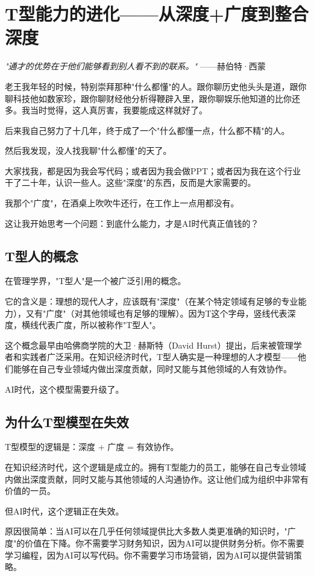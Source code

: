 \chapter{T型能力的进化——从深度+广度到整合深度}


\textit{"通才的优势在于他们能够看到别人看不到的联系。"}
——赫伯特·西蒙


老王我年轻的时候，特别崇拜那种"什么都懂"的人。跟你聊历史他头头是道，跟你聊科技他如数家珍，跟你聊财经他分析得鞭辟入里，跟你聊娱乐他知道的比你还多。我当时觉得，这人真厉害，我要能成这样就好了。

后来我自己努力了十几年，终于成了一个"什么都懂一点，什么都不精"的人。

然后我发现，没人找我聊"什么都懂"的天了。

大家找我，都是因为我会写代码；或者因为我会做PPT；或者因为我在这个行业干了二十年，认识一些人。这些"深度"的东西，反而是大家需要的。

我那个"广度"，在酒桌上吹吹牛还行，在工作上一点用都没有。

这让我开始思考一个问题：到底什么能力，才是AI时代真正值钱的？

\section{T型人的概念}


在管理学界，"T型人"是一个被广泛引用的概念。

它的含义是：理想的现代人才，应该既有"深度"（在某个特定领域有足够的专业能力），又有"广度"（对其他领域也有足够的理解）。因为T这个字母，竖线代表深度，横线代表广度，所以被称作"T型人"。

这个概念最早由哈佛商学院的大卫·赫斯特（David Hurst）提出，后来被管理学者和实践者广泛采用。在知识经济时代，T型人确实是一种理想的人才模型——他们能够在自己专业领域内做出深度贡献，同时又能与其他领域的人有效协作。

AI时代，这个模型需要升级了。

\section{为什么T型模型在失效}


T型模型的逻辑是：深度 + 广度 = 有效协作。

在知识经济时代，这个逻辑是成立的。拥有T型能力的员工，能够在自己专业领域内做出深度贡献，同时又能与其他领域的人沟通协作。这让他们成为组织中非常有价值的一员。

但AI时代，这个逻辑正在失效。

原因很简单：当AI可以在几乎任何领域提供比大多数人类更准确的知识时，"广度"的价值在下降。你不需要学习财务知识，因为AI可以提供财务分析。你不需要学习编程，因为AI可以写代码。你不需要学习市场营销，因为AI可以提供营销策略。

